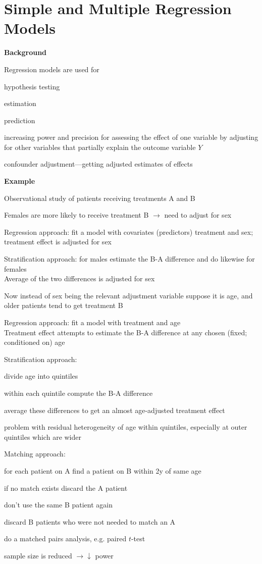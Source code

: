 

\chapter{Simple and Multiple Regression Models}
{\larger\textbf{Background}}

Regression models are used for
\bi
\item hypothesis testing
\item estimation
\item prediction
\item increasing power and precision for assessing the effect of one
  variable by adjusting for other variables that partially explain the outcome
  variable $Y$
\item confounder adjustment---getting adjusted estimates of effects
\ei

{\larger\textbf{Example}}
\bi
\item Observational study of patients receiving treatments A and B
\item Females are more likely to receive treatment B $\rightarrow$
  need to adjust for sex
\item Regression approach: fit a model with covariates (predictors)
  treatment and sex; treatment effect is adjusted for sex
\item Stratification approach: for males estimate the B-A difference
  and do likewise for females\\Average of the two differences is
  adjusted for sex
\ei

Now instead of sex being the relevant adjustment variable suppose it
is age, and older patients tend to get treatment B
\bi
\item Regression approach: fit a model with treatment and
  age\\Treatment effect attempts to estimate the B-A difference at any
  chosen (fixed; conditioned on) age
\item Stratification approach:
  \bi
  \item divide age into quintiles
  \item within each quintile compute the B-A difference
  \item average these differences to get an almost age-adjusted
    treatment effect
  \item problem with residual heterogeneity of age within quintiles,
    especially at outer quintiles which are wider
  \ei
\item Matching approach:
  \bi
  \item for each patient on A find a patient on B within 2y of same age
  \item if no match exists discard the A patient
  \item don't use the same B patient again
  \item discard B patients who were not needed to match an A
  \item do a matched pairs analysis, e.g. paired $t$-test
  \item sample size is reduced $\rightarrow \downarrow$ power
  \ei
\ei

